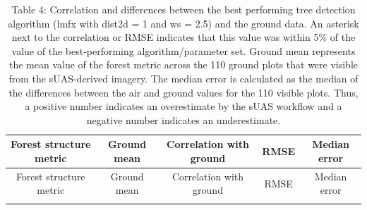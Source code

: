 \documentclass[]{article}
\begin{document}
\begin{longtable}[]{@{}ccccc@{}}
\caption{Table 4: Correlation and differences between the best
performing tree detection algorithm (lmfx with dist2d = 1 and ws = 2.5)
and the ground data. An asterisk next to the correlation or RMSE
indicates that this value was within 5\% of the value of the
best-performing algorithm/parameter set. Ground mean represents the mean
value of the forest metric across the 110 ground plots that were visible
from the sUAS-derived imagery. The median error is calculated as the
median of the differences between the air and ground values for the 110
visible plots. Thus, a positive number indicates an overestimate by the
sUAS workflow and a negative number indicates an
underestimate.}\tabularnewline
\toprule
\begin{minipage}[b]{0.28\columnwidth}\centering\strut
Forest structure metric\strut
\end{minipage} & \begin{minipage}[b]{0.13\columnwidth}\centering\strut
Ground mean\strut
\end{minipage} & \begin{minipage}[b]{0.24\columnwidth}\centering\strut
Correlation with ground\strut
\end{minipage} & \begin{minipage}[b]{0.08\columnwidth}\centering\strut
RMSE\strut
\end{minipage} & \begin{minipage}[b]{0.13\columnwidth}\centering\strut
Median error\strut
\end{minipage}\tabularnewline
\midrule
\endfirsthead
\toprule
\begin{minipage}[b]{0.28\columnwidth}\centering\strut
Forest structure metric\strut
\end{minipage} & \begin{minipage}[b]{0.13\columnwidth}\centering\strut
Ground mean\strut
\end{minipage} & \begin{minipage}[b]{0.24\columnwidth}\centering\strut
Correlation with ground\strut
\end{minipage} & \begin{minipage}[b]{0.08\columnwidth}\centering\strut
RMSE\strut
\end{minipage} & \begin{minipage}[b]{0.13\columnwidth}\centering\strut
Median error\strut
\end{minipage}\tabularnewline
\midrule
\endhead
\begin{minipage}[t]{0.28\columnwidth}\centering\strut

\end{minipage}
\end{longtable}
\end{document}
